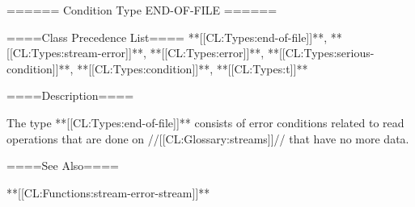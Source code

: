 ====== Condition Type END-OF-FILE ======

====Class Precedence List==== **[[CL:Types:end-of-file]]**, **[[CL:Types:stream-error]]**, **[[CL:Types:error]]**, **[[CL:Types:serious-condition]]**, **[[CL:Types:condition]]**, **[[CL:Types:t]]**

====Description====

The type **[[CL:Types:end-of-file]]** consists of error conditions related to read operations that are done on //[[CL:Glossary:streams]]// that have no more data.

====See Also====

**[[CL:Functions:stream-error-stream]]**


